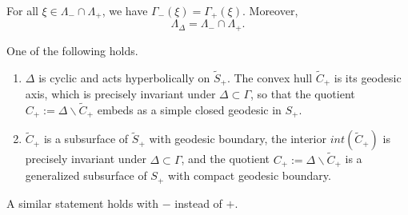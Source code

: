 \documentclass[10pt,a4paper]{amsart}
\begin{document}
\begin{claim}\label{intersectlimit}
	For all $\xi \in \Lambda_-\cap \Lambda_+$, we have $\Gamma_-(\xi)=\Gamma_+(\xi)$. Moreover,
	$$\Lambda_\Delta = \Lambda_- \cap \Lambda_+.$$\end{claim}

\begin{claim}\label{precise} One of the following holds.
	\begin{enumerate}
		\item $\Delta$ is cyclic and acts hyperbolically on $\tilde S_+$. The convex hull $\tilde C_+$ is its geodesic axis, which is precisely invariant under $\Delta\subset \Gamma$, so that the quotient $C_+:=\Delta \backslash \tilde C_+$ embeds as a simple closed geodesic in $S_+$.
		\item $\tilde C_+$ is a subsurface of $\tilde S_+$ with geodesic boundary, the interior $int(\tilde C_+)$ is precisely invariant under $\Delta\subset \Gamma$, and the quotient $C_+ := \Delta \backslash \tilde C_+$ is a generalized subsurface of $S_+$ with compact geodesic boundary.
	\end{enumerate}
A similar statement holds with $-$ instead of $+$.
\end{claim}
\end{document}
